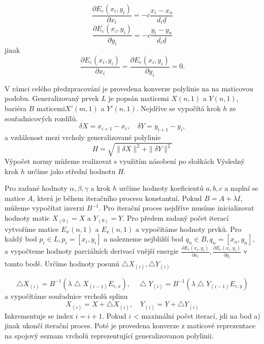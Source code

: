 \documentclass[oneside,12pt,a4paper]{book}
\begin{document}
\begin{equation}
 \frac{\partial E_e(x_i,y_i)}{\partial x_i} = -c\frac{x_i-x_n}{d_i\underline{d}}
\end{equation}
\begin{equation}
\frac{\partial E_e(x_i,y_i)}{\partial y_i} = -c\frac{y_i-y_n}{d_i\underline{d}}
\end{equation}
jinak
\begin{equation}
 \frac{\partial E_e(x_i,y_i)}{\partial x_i} = \frac{\partial E_e(x_i,y_i)}{\partial y_i} = 0.
\end{equation}

V rámci celého předzpracování je provedena konverze polylinie na na maticovou podobu. Generalizovaný prvek $L$ je popsán maticemi $X(n,1)$ a $Y(n,1)$, bariéra $B$ maticemi$ X'(m,1)$ a $Y'(n,1)$. Nejdříve se vypočítá krok $h$ ze souřadnicových rozdílů.
\begin{equation}
\delta X = x_{i+1}-x_i,\quad \delta Y = y_{i+1}-y_i,
\end{equation}
 a vzdálenost mezi vrcholy generalizované polylinie
 \begin{equation}
H = \sqrt{ \| \delta X\|^2 +\| \delta Y\|^2}
\end{equation}
Výpočet normy můžeme realizovat s využitím násobení po složkách
Výsledný krok $h$ určíme jako střední hodnotu $H$.

Pro zadané hodnoty $\alpha ,\beta ,\gamma $ a krok $h$ 
určíme hodnoty koeficientů $a, b, c$ a naplní se matice $A$, 
která je během iteračního procesu konstantní. Pokud 
$B = A+ \lambda I$, můžeme vypočítat inverzi $B^{-1}$.
Pro iterační proces nejdříve musíme inicializovat hodnoty matic $X_{(0)} = X$ a $Y_{(0)} = Y$. Pro předem zadaný počet iterací vytvoříme matice  $E_x(n,1)$ a $E_x(n,1)$ a vypočítáme hodnoty prvků. Pro každý bod $p_i \in L, p_i = [x_i,y_i]$ a nalezneme nejbližší bod $q_n \in B, q_n = [x_n,y_n],$ a vypočteme hodnoty parciálních derivací vnější energie  $\frac{\partial E_e(x_i,y_i)}{\partial x_i}, 
\frac{\partial E_e(x_i,y_i)}{\partial y_i}  $
v tomto bodě. Určíme hodnoty posunů $\bigtriangleup X_{(i)}, \bigtriangleup Y_{(i)}$

 \begin{equation}
\bigtriangleup X_{(i)} = B^{-1}(\lambda \bigtriangleup X_{(i-1)} E_{e,x}), 
\quad 
\bigtriangleup Y_{(i)} = B^{-1}(\lambda \bigtriangleup Y_{(i-1)}E_{e,y})
\end{equation}
a vypočítáme souřadnice vrcholů splinu
 \begin{equation}
 X_{(i)} = X + \bigtriangleup X_{(i)},
\quad 
 Y_{(i)} = Y + \bigtriangleup Y_{(i)}
\end{equation}
Inkrementuje se index $i = i+1$. Pokud $i$ < maximální počet iterací, jdi na bod a) jinak ukončí iterační proces. Poté je provedena konverze z maticové reprezentace na spojový seznam vrcholů reprezentující generalizovanou polylinii. 
\end{document}
